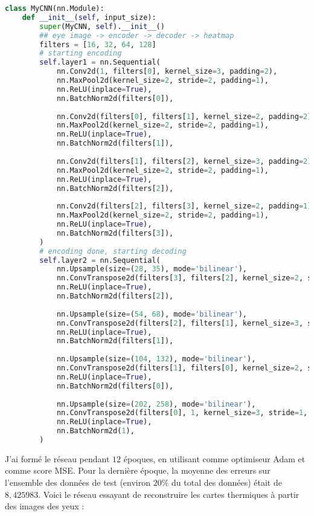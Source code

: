 \begin{lstlisting}[language=python]
class MyCNN(nn.Module):
    def __init__(self, input_size):
        super(MyCNN, self).__init__()
        ## eye image -> encoder -> decoder -> heatmap
        filters = [16, 32, 64, 128]
        # starting encoding
        self.layer1 = nn.Sequential(
            nn.Conv2d(1, filters[0], kernel_size=3, padding=2),
            nn.MaxPool2d(kernel_size=2, stride=2, padding=1),
            nn.ReLU(inplace=True),
            nn.BatchNorm2d(filters[0]),
            
            nn.Conv2d(filters[0], filters[1], kernel_size=2, padding=2),
            nn.MaxPool2d(kernel_size=2, stride=2, padding=1),
            nn.ReLU(inplace=True),
            nn.BatchNorm2d(filters[1]),
            
            nn.Conv2d(filters[1], filters[2], kernel_size=3, padding=2),
            nn.MaxPool2d(kernel_size=2, stride=2, padding=1),
            nn.ReLU(inplace=True),
            nn.BatchNorm2d(filters[2]),
            
            nn.Conv2d(filters[2], filters[3], kernel_size=2, padding=1),
            nn.MaxPool2d(kernel_size=2, stride=2, padding=1),
            nn.ReLU(inplace=True),
            nn.BatchNorm2d(filters[3]),
        )
        # encoding done, starting decoding
        self.layer2 = nn.Sequential(
            nn.Upsample(size=(28, 35), mode='bilinear'),
            nn.ConvTranspose2d(filters[3], filters[2], kernel_size=2, stride=1, padding=1),
            nn.ReLU(inplace=True),
            nn.BatchNorm2d(filters[2]),
            
            nn.Upsample(size=(54, 68), mode='bilinear'),
            nn.ConvTranspose2d(filters[2], filters[1], kernel_size=3, stride=1, padding=2),
            nn.ReLU(inplace=True),
            nn.BatchNorm2d(filters[1]),
            
            nn.Upsample(size=(104, 132), mode='bilinear'),
            nn.ConvTranspose2d(filters[1], filters[0], kernel_size=2, stride=1, padding=2),
            nn.ReLU(inplace=True),
            nn.BatchNorm2d(filters[0]),
        
            nn.Upsample(size=(202, 258), mode='bilinear'),
            nn.ConvTranspose2d(filters[0], 1, kernel_size=3, stride=1, padding=2),
            nn.ReLU(inplace=True),
            nn.BatchNorm2d(1),
        )
\end{lstlisting}


J'ai formé le réseau pendant $12$ époques, en utilisant comme optimiseur Adam et comme score MSE.
Pour la dernière époque, la moyenne des erreurs sur l'ensemble des données de test (environ $20\%$ du total des données) était de $8,425983$.
Voici le réseau essayant de reconstruire les cartes thermiques à partir des images des yeux :

